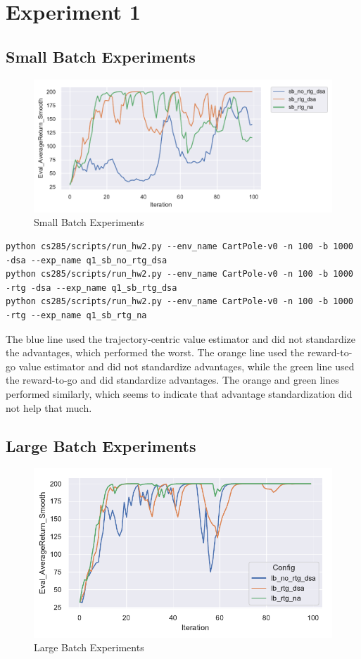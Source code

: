 \documentclass[letterpaper, 10pt]{article}
\begin{document}
\section{Experiment 1}
\subsection{Small Batch Experiments}
\begin{figure}[h]
\centering
\includegraphics{figures/q1_sb.pdf}
\caption{Small Batch Experiments}
\end{figure}

\begin{lstlisting}[caption=Exact command line configurations]
python cs285/scripts/run_hw2.py --env_name CartPole-v0 -n 100 -b 1000 -dsa --exp_name q1_sb_no_rtg_dsa
python cs285/scripts/run_hw2.py --env_name CartPole-v0 -n 100 -b 1000 -rtg -dsa --exp_name q1_sb_rtg_dsa
python cs285/scripts/run_hw2.py --env_name CartPole-v0 -n 100 -b 1000 -rtg --exp_name q1_sb_rtg_na
\end{lstlisting}

The blue line used the trajectory-centric value estimator and did not standardize the advantages, which performed 
the worst. The orange line used the reward-to-go value estimator and did not standardize advantages, while the green line 
used the reward-to-go and did standardize advantages. The orange and green lines performed similarly, which seems to indicate 
that advantage standardization did not help that much. 

\newpage

\subsection{Large Batch Experiments}
\begin{figure}[h]
\centering
\includegraphics{figures/q1_lb.pdf}
\caption{Large Batch Experiments}
\end{figure}
\end{document}
